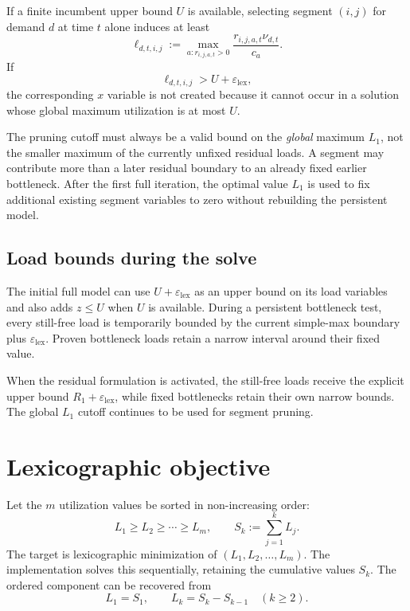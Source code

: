 \documentclass[11pt,a4paper]{article}
\begin{document}
If a finite incumbent upper bound $U$ is available, selecting segment $(i,j)$
for demand $d$ at time $t$ alone induces at least
\begin{equation}
\ell_{d,t,i,j}:=
\max_{a:r_{i,j,a,t}>0}
\frac{r_{i,j,a,t}\nu_{d,t}}{c_a}.
\tag{7}
\end{equation}
If
\[
\ell_{d,t,i,j}>U+\varepsilon_{\mathrm{lex}},
\]
the corresponding $x$ variable is not created because it cannot occur in a
solution whose global maximum utilization is at most $U$.

The pruning cutoff must always be a valid bound on the \emph{global} maximum
$L_1$, not the smaller maximum of the currently unfixed residual loads. A
segment may contribute more than a later residual boundary to an already fixed
earlier bottleneck. After the first full iteration, the optimal value $L_1$
is used to fix additional existing segment variables to zero without rebuilding
the persistent model.

\subsection{Load bounds during the solve}

The initial full model can use $U+\varepsilon_{\mathrm{lex}}$ as an upper bound
on its load variables and also adds $z\leq U$ when $U$ is available. During a
persistent bottleneck test, every still-free load is temporarily bounded by the
current simple-max boundary plus $\varepsilon_{\mathrm{lex}}$. Proven bottleneck
loads retain a narrow interval around their fixed value.

When the residual formulation is activated, the still-free loads receive the
explicit upper bound $R_1+\varepsilon_{\mathrm{lex}}$, while fixed bottlenecks
retain their own narrow bounds. The global $L_1$ cutoff continues to be used
for segment pruning.

\section{Lexicographic objective}

Let the $m$ utilization values be sorted in non-increasing order:
\[
L_1\geq L_2\geq\cdots\geq L_m,
\qquad
S_k:=\sum_{j=1}^{k}L_j.
\]
The target is lexicographic minimization of $(L_1,L_2,\ldots,L_m)$. The
implementation solves this sequentially, retaining the cumulative values
$S_k$. The ordered component can be recovered from
\[
L_1=S_1,
\qquad
L_k=S_k-S_{k-1}\quad(k\geq2).
\]
\end{document}
